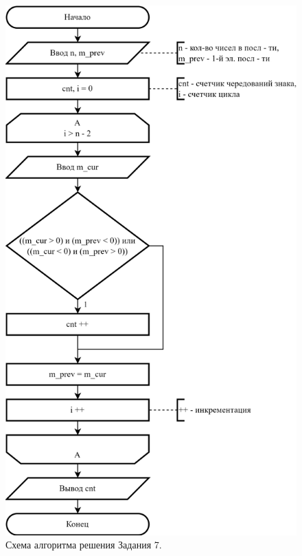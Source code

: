 \documentclass[oneside,a4paper,14pt]{extarticle}
\begin{document}
\begin{figure}
	\centering
	\includegraphics[height=0.8\textheight]{img/7-scheme.png} %
	\caption{Схема алгоритма решения Задания 7.} %
\end{figure}
\end{document}
